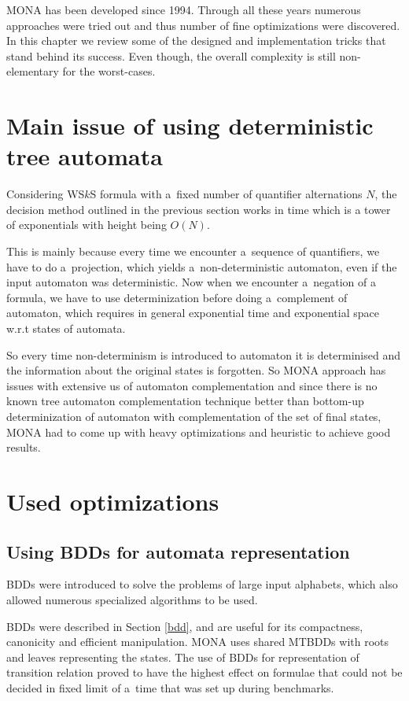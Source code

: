 \textsc{MONA} has been developed since 1994. Through all these years numerous
approaches were tried out and thus number of fine optimizations were discovered.
In this chapter we review some of the designed and implementation tricks that
stand behind its success. Even though, the overall complexity is still
non-elementary for the worst-cases.

\section{Main issue of using deterministic tree automata}

Considering WS$k$S formula with a~fixed number of quantifier alternations $N$,
the decision method outlined in the previous section works in time which is a
tower of exponentials with height being $O(N)$.

This is mainly because every time we encounter a~sequence of quantifiers, we
have to do a~projection, which yields a~non-deterministic automaton, even if the
input automaton was deterministic. Now when we encounter a~negation of a
formula, we have to use determinization before doing a~complement of automaton,
which requires in general exponential time and exponential space w.r.t states of
automata.

So every time non-determinism is introduced to automaton it is determinised and
the information about the original states is forgotten. So \textsc{MONA}
approach has issues with extensive us of automaton complementation and since there
is no known tree automaton complementation technique better than bottom-up
determinization of automaton with complementation of the set of final states,
\textsc{MONA} had to come up with heavy optimizations and heuristic to achieve
good results.

 \section{Used optimizations}\label{monasecrets}
\subsection{Using BDDs for automata representation}\label{monabdd}
BDDs were introduced to solve the problems of large input alphabets, which also
allowed numerous specialized algorithms to be used.

BDDs were described in Section \ref{bdd}, and are useful for its compactness,
canonicity and efficient manipulation. \textsc{MONA} uses shared MTBDDs with
roots and leaves representing the states. The use of BDDs for representation  of
transition relation proved to have the highest effect on formulae that could not
be decided in fixed limit of a~time that was set up during benchmarks.

